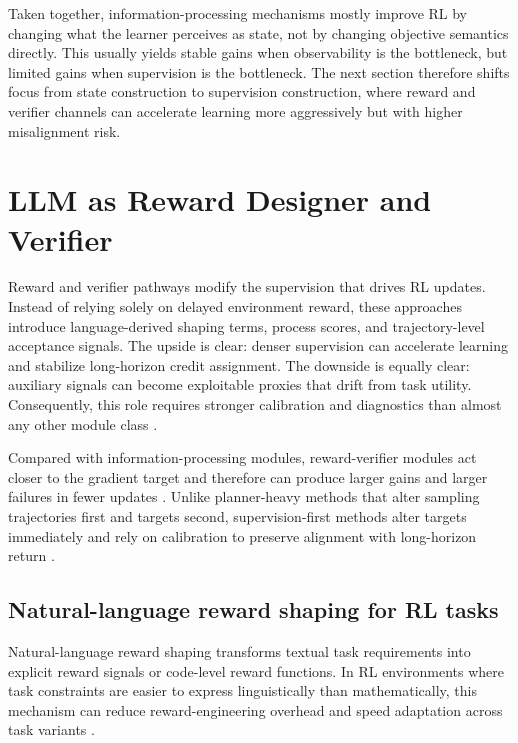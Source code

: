 ﻿\documentclass[conference]{IEEEtran}
\begin{document}
Taken together, information-processing mechanisms mostly improve RL by changing what the learner perceives as state, not by changing objective semantics directly. This usually yields stable gains when observability is the bottleneck, but limited gains when supervision is the bottleneck. The next section therefore shifts focus from state construction to supervision construction, where reward and verifier channels can accelerate learning more aggressively but with higher misalignment risk.
\section{LLM as Reward Designer and Verifier}
Reward and verifier pathways modify the supervision that drives RL updates. Instead of relying solely on delayed environment reward, these approaches introduce language-derived shaping terms, process scores, and trajectory-level acceptance signals. The upside is clear: denser supervision can accelerate learning and stabilize long-horizon credit assignment. The downside is equally clear: auxiliary signals can become exploitable proxies that drift from task utility. Consequently, this role requires stronger calibration and diagnostics than almost any other module class \cite{arxiv_p_2310_12931,arxiv_p_2602_06493,arxiv_p_2602_12579,arxiv_p_2510_20867,arxiv_p_2512_05686,arxiv_p_2602_09367}.

Compared with information-processing modules, reward-verifier modules act closer to the gradient target and therefore can produce larger gains and larger failures in fewer updates \cite{arxiv_p_2205_12258,arxiv_p_2404_03648,arxiv_p_2602_00994}. Unlike planner-heavy methods that alter sampling trajectories first and targets second, supervision-first methods alter targets immediately and rely on calibration to preserve alignment with long-horizon return \cite{arxiv_p_2204_01691,arxiv_p_2305_16291,arxiv_p_2602_07848}.

\subsection{Natural-language reward shaping for RL tasks}
Natural-language reward shaping transforms textual task requirements into explicit reward signals or code-level reward functions. In RL environments where task constraints are easier to express linguistically than mathematically, this mechanism can reduce reward-engineering overhead and speed adaptation across task variants \cite{arxiv_p_2310_12931,arxiv_p_2309_11489,arxiv_p_2309_06687,doi_p_10_3390_app14198868}.
\end{document}
